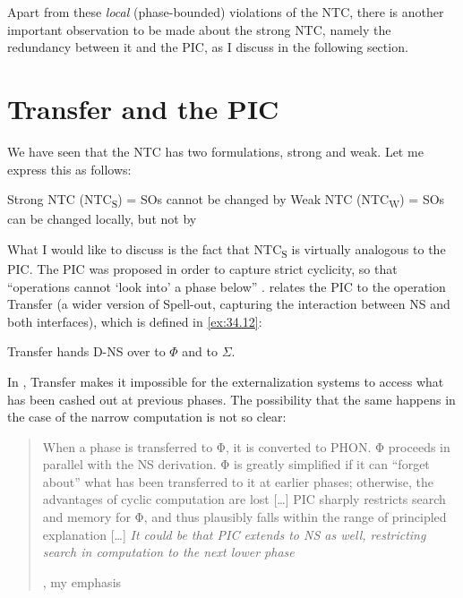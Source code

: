 \documentclass[output=paper]{langsci/langscibook}
\begin{document}
Apart from these \emph{local} (phase-bounded) violations of the \gls{NTC},
there is another important observation to be made about the strong \gls{NTC},
namely the redundancy between it and the \gls{PIC}, as I discuss in the
following section.

\section{Transfer and the PIC}\label{sec:34.3}

We have seen that the \gls{NTC} has two
formulations, strong and weak. Let me express this as follows:

\ea%
    \label{ex:34.11}
    \ea Strong \gls{NTC} (NTC\textsubscript{S}) = \glspl{SO} cannot be changed
    by 
    \ex Weak \gls{NTC} (NTC\textsubscript{W}) = \glspl{SO} can be changed
    locally, but not by 
	\z
\z

What I would like to discuss is the fact that NTC\textsubscript{S} is virtually
analogous to the \gls{PIC}. The \gls{PIC} was proposed in order to capture
strict cyclicity, so that \enquote{operations cannot ‘look into’ a phase below}
\citep[108]{Chomsky2000}. \citet{Chomsky2004} relates the \gls{PIC} to the
operation Transfer (a wider version of Spell-out, capturing the interaction
between \gls{NS} and both interfaces), which is defined in \eqref{ex:34.12}:

\ea%
    \label{ex:34.12}
         Transfer hands D-\gls{NS} over to ${\Phi}$ and to ${\Sigma}$.
         \parencite[107]{Chomsky2004}
\z

In \citet{Chomsky2004}, Transfer makes it impossible for the externalization
systems to access what has been cashed out at previous phases. The possibility
that the same happens in the case of the narrow computation is not so clear:

\blockquote[{\citealt[107]{Chomsky2004}, my emphasis}][.]{When a phase is
    transferred to Φ, it is converted to PHON. Φ proceeds in parallel with the
    \gls{NS} derivation. Φ is greatly simplified if it can “forget about” what has
    been transferred to it at earlier phases; otherwise, the advantages of
    cyclic computation are lost [\dots{}] \gls{PIC} sharply restricts search
    and memory for Φ, and thus plausibly falls within the range of principled
    explanation [\dots{}] \emph{It could be that \gls{PIC} extends to \gls{NS} as
well, restricting search in computation to the next lower phase}}
\end{document}
